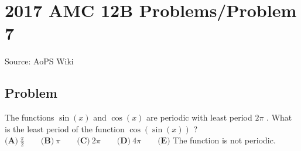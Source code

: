 \documentclass[12pt]{article}
\begin{document}
\section*{{2017 AMC 12B Problems/Problem 7}}
Source: AoPS Wiki

\subsection*{Problem}
The functions $\sin(x)$ and $\cos(x)$ are periodic with least period $2\pi$ . What is the least period of the function $\cos(\sin(x))$ ? $\textbf{(A)}\ \frac{\pi}{2}\qquad\textbf{(B)}\ \pi\qquad\textbf{(C)}\ 2\pi \qquad\textbf{(D)}\ 4\pi \qquad\textbf{(E)}$ The function is not periodic.
\end{document}
